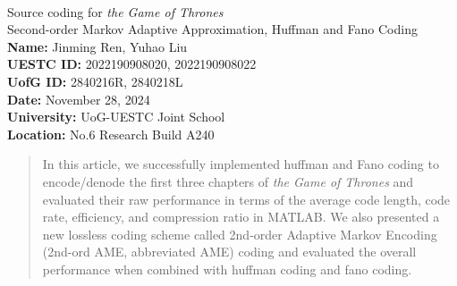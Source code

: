 \documentclass[12pt,twoside]{article}
\begin{document}
\begin{center}
    \textbf{ } \\
    \vspace{14em}
    {\huge \textsf{Source coding for \textit{the Game of Thrones}}} \\
    \vspace{1.5em}
    {\large \textsf{Second-order Markov Adaptive Approximation, Huffman and Fano Coding}} \\
    \vspace{1em}
    \vspace{1.5cm}
    \textbf{Name:} Jinming Ren, Yuhao Liu \\
    \vspace{0.5em}
    \textbf{UESTC ID:} 2022190908020, 2022190908022 \\
    \vspace{0.5em}
    \textbf{UofG ID:} 2840216R, 2840218L \\
    \vspace{0.5em}
    \textbf{Date:} November 28, 2024 \\
    \vspace{0.5em}
    \vspace{1cm}
    \textbf{University:} UoG-UESTC Joint School \\
    \vspace{0.5em}
    \textbf{Location:} No.6 Research Build A240 \\
    \vspace{2cm}
\end{center}

\newpage
\tableofcontents

\newpage
\listoffigures
\listoftables
\newpage

\begin{abstract}
    In this article, we successfully implemented huffman and Fano coding to encode/denode the first three chapters of \textit{the Game of Thrones} and evaluated their raw performance in terms of the average code length, code rate, efficiency, and compression ratio in MATLAB. We also presented a new lossless coding scheme called 2nd-order Adaptive Markov Encoding (2nd-ord AME, abbreviated AME) coding and evaluated the overall performance when combined with huffman coding and fano coding.
\end{abstract}
\end{document}
